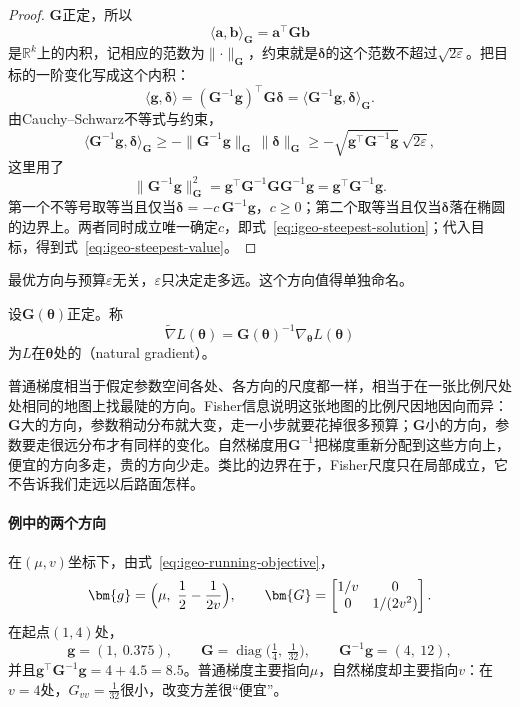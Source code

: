 \begin{proof}
$\bm{G}$正定，所以
\[
  \langle\bm{a},\bm{b}\rangle_{\bm{G}}=\bm{a}^{\top}\bm{G}\bm{b}
\]
是$\mathbb{R}^{k}$上的内积，记相应的范数为$\lVert\cdot\rVert_{\bm{G}}$，约束就是$\bm{\delta}$的这个范数不超过$\sqrt{2\varepsilon}$。把目标的一阶变化写成这个内积：
\[
  \langle\bm{g},\bm{\delta}\rangle=(\bm{G}^{-1}\bm{g})^{\top}\bm{G}\bm{\delta}=\langle\bm{G}^{-1}\bm{g},\bm{\delta}\rangle_{\bm{G}} .
\]
由Cauchy--Schwarz不等式与约束，
\[
  \langle\bm{G}^{-1}\bm{g},\bm{\delta}\rangle_{\bm{G}}\geq-\lVert\bm{G}^{-1}\bm{g}\rVert_{\bm{G}}\,\lVert\bm{\delta}\rVert_{\bm{G}}\geq-\sqrt{\bm{g}^{\top}\bm{G}^{-1}\bm{g}}\,\sqrt{2\varepsilon},
\]
这里用了
\[
  \lVert\bm{G}^{-1}\bm{g}\rVert_{\bm{G}}^{2}=\bm{g}^{\top}\bm{G}^{-1}\bm{G}\bm{G}^{-1}\bm{g}=\bm{g}^{\top}\bm{G}^{-1}\bm{g}.
\]
第一个不等号取等当且仅当$\bm{\delta}=-c\,\bm{G}^{-1}\bm{g}$，$c\geq0$；第二个取等当且仅当$\bm{\delta}$落在椭圆的边界上。两者同时成立唯一确定$c$，即式~\eqref{eq:igeo-steepest-solution}；代入目标，得到式~\eqref{eq:igeo-steepest-value}。
\end{proof}

最优方向与预算$\varepsilon$无关，$\varepsilon$只决定走多远。这个方向值得单独命名。

\begin{definition}[自然梯度]
\label{def:igeo-natural-gradient}
设$\bm{G}(\bm{\theta})$正定。称
\begin{equation}
  \widetilde{\nabla}L(\bm{\theta})=\bm{G}(\bm{\theta})^{-1}\nabla_{\bm{\theta}}L(\bm{\theta})
  \label{eq:igeo-natural-gradient}
\end{equation}
为$L$在$\bm{\theta}$处的（natural gradient）。
\end{definition}

普通梯度相当于假定参数空间各处、各方向的尺度都一样，相当于在一张比例尺处处相同的地图上找最陡的方向。Fisher信息说明这张地图的比例尺因地因向而异：$\bm{G}$大的方向，参数稍动分布就大变，走一小步就要花掉很多预算；$\bm{G}$小的方向，参数要走很远分布才有同样的变化。自然梯度用$\bm{G}^{-1}$把梯度重新分配到这些方向上，便宜的方向多走，贵的方向少走。类比的边界在于，Fisher尺度只在局部成立，它不告诉我们走远以后路面怎样。

\paragraph{例中的两个方向}
在$(\mu,v)$坐标下，由式~\eqref{eq:igeo-running-objective}，
\[
  \bm{g}=\Bigl(\mu,\ \frac12-\frac{1}{2v}\Bigr),\qquad\bm{G}=\begin{bmatrix}1/v&0\\0&1/(2v^{2})\end{bmatrix}.
\]
在起点$(1,4)$处，
\[
  \bm{g}=(1,\ 0.375),\qquad\bm{G}=\operatorname{diag}\bigl(\tfrac14,\ \tfrac1{32}\bigr),\qquad\bm{G}^{-1}\bm{g}=(4,\ 12),
\]
并且$\bm{g}^{\top}\bm{G}^{-1}\bm{g}=4+4.5=8.5$。普通梯度主要指向$\mu$，自然梯度却主要指向$v$：在$v=4$处，$G_{vv}=\frac1{32}$很小，改变方差很“便宜”。


